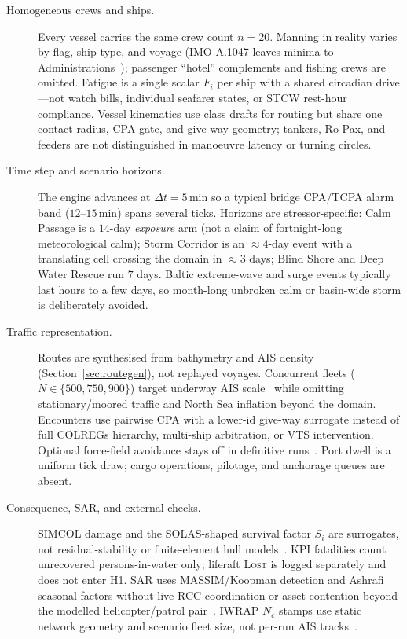 \documentclass[cameraready]{Interspeech}
\begin{document}
\begin{description}

  \item[Homogeneous crews and ships.]
  Every vessel carries the same crew count $n=20$. Manning in reality varies by flag, ship type, and voyage (IMO A.1047 leaves minima to Administrations~\cite{imo1047}); passenger ``hotel'' complements and fishing crews are omitted. Fatigue is a single scalar $F_i$ per ship with a shared circadian drive---not watch bills, individual seafarer states, or STCW rest-hour compliance. Vessel kinematics use class drafts for routing but share one contact radius, CPA gate, and give-way geometry; tankers, Ro-Pax, and feeders are not distinguished in manoeuvre latency or turning circles.

  \item[Time step and scenario horizons.]
  The engine advances at $\Delta t = 5$\,min so a typical bridge CPA/TCPA alarm band ($12$--$15$\,min) spans several ticks. Horizons are stressor-specific: Calm Passage is a $14$-day \emph{exposure} arm (not a claim of fortnight-long meteorological calm); Storm Corridor is an ${\approx}4$-day event with a translating cell crossing the domain in ${\approx}3$ days; Blind Shore and Deep Water Rescue run $7$ days. Baltic extreme-wave and surge events typically last hours to a few days, so month-long unbroken calm or basin-wide storm is deliberately avoided.

  \item[Traffic representation.]
  Routes are synthesised from bathymetry and AIS density (Section~\ref{sec:routegen}), not replayed voyages. Concurrent fleets ($N\in\{500,750,900\}$) target underway AIS scale~\cite{huetten2025baltic} while omitting stationary/moored traffic and North Sea inflation beyond the domain. Encounters use pairwise CPA with a lower-id give-way surrogate instead of full COLREGs hierarchy, multi-ship arbitration, or VTS intervention. Optional force-field avoidance stays off in definitive runs~\cite{xiao2013}. Port dwell is a uniform tick draw; cargo operations, pilotage, and anchorage queues are absent.

  \item[Consequence, SAR, and external checks.]
  SIMCOL damage and the SOLAS-shaped survival factor $S_i$ are surrogates, not residual-stability or finite-element hull models~\cite{lutzen2001,solas2020}. KPI fatalities count unrecovered persons-in-water only; liferaft \textsc{Lost} is logged separately and does not enter H1. SAR uses MASSIM/Koopman detection and Ashrafi seasonal factors without live RCC coordination or asset contention beyond the modelled helicopter/patrol pair~\cite{karatas2018,ashrafi2024}. IWRAP $N_c$ stamps use static network geometry and scenario fleet size, not per-run AIS tracks~\cite{friishansen2008iwrap}.


\end{description}
\end{document}
